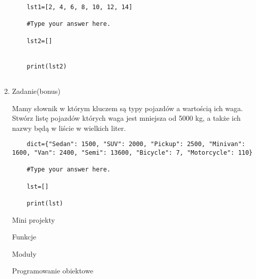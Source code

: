 \documentclass[11pt]{article}
\begin{document}
\begin{enumerate}
\begin{lstlisting}
	lst1=[2, 4, 6, 8, 10, 12, 14]
	
	#Type your answer here.
	
	lst2=[]
	
	
	print(lst2)
	
\end{lstlisting}

\item 
\begin{Large}
	Zadanie(bonus)
\end{Large}
\par
Mamy słownik w którym kluczem są typy pojazdów a wartością ich waga. Stwórz listę pojazdów których waga jest mniejsza od 5000 kg, a także ich nazwy będą w liście w wielkich liter.
\begin{lstlisting}
	dict={"Sedan": 1500, "SUV": 2000, "Pickup": 2500, "Minivan": 1600, "Van": 2400, "Semi": 13600, "Bicycle": 7, "Motorcycle": 110}
	
	#Type your answer here.
	
	lst=[]
	
	print(lst)
\end{lstlisting}

\medskip
\begin{Large}
	Mini projekty
\end{Large}

\medskip
\begin{Large}
	Funkcje
\end{Large}


\medskip
\begin{Large}
	Moduły
\end{Large}

\medskip
\begin{Large}
	Programowanie obiektowe
\end{Large}

\end{enumerate}
	
	
\end{document}
